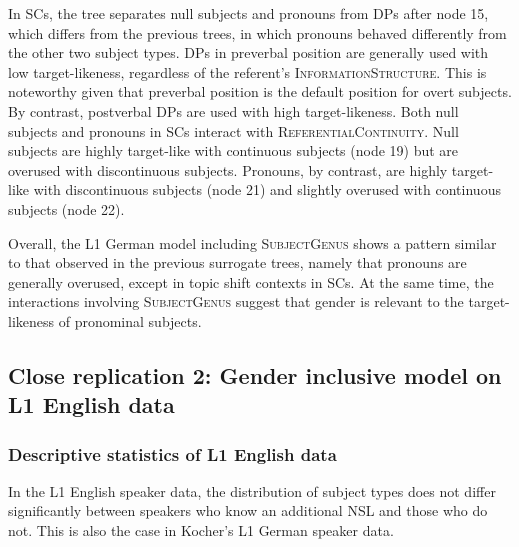 \documentclass[
  letterpaper,
  DIV=11,
  numbers=noendperiod]{scrartcl}
\begin{document}
In SCs, the tree separates null subjects and pronouns from DPs after
node 15, which differs from the previous trees, in which pronouns
behaved differently from the other two subject types. DPs in preverbal
position are generally used with low target-likeness, regardless of the
referent's \textsc{InformationStructure}. This is noteworthy given that
preverbal position is the default position for overt subjects. By
contrast, postverbal DPs are used with high target-likeness. Both null
subjects and pronouns in SCs interact with
\textsc{ReferentialContinuity}. Null subjects are highly target-like
with continuous subjects (node 19) but are overused with discontinuous
subjects. Pronouns, by contrast, are highly target-like with
discontinuous subjects (node 21) and slightly overused with continuous
subjects (node 22).

Overall, the L1 German model including \textsc{SubjectGenus} shows a
pattern similar to that observed in the previous surrogate trees, namely
that pronouns are generally overused, except in topic shift contexts in
SCs. At the same time, the interactions involving \textsc{SubjectGenus}
suggest that gender is relevant to the target-likeness of pronominal
subjects.

\subsection{Close replication 2: Gender inclusive model on L1 English
data}\label{close-replication-2-gender-inclusive-model-on-l1-english-data}

\subsubsection{Descriptive statistics of L1 English
data}\label{descriptive-statistics-of-l1-english-data}

In the L1 English speaker data, the distribution of subject types does
not differ significantly between speakers who know an additional NSL and
those who do not. This is also the case in Kocher's L1 German speaker
data.
\end{document}
